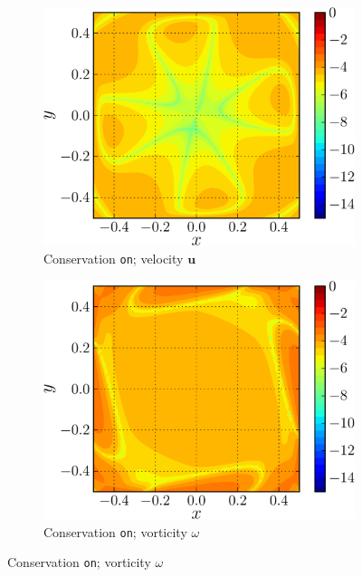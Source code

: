 	\begin{figure}[!t]
     \centering
     \begin{subfigure}[t]{0.45\textwidth}
             \includegraphics[width=\linewidth]{./figures/validation/lambOseent2/lambOseen_fully_vErrorFinal_compressed-crop.png}
             \caption{Conservation \texttt{on}; velocity $\mathbf{u}$}
             \label{fig:lambOseen_fullyCon_vErrorFinal}
     \end{subfigure}%
     \qquad %
    \begin{subfigure}[t]{0.45\textwidth}
             \includegraphics[width=\linewidth]{./figures/validation/lambOseent2/lambOseen_fully_wErrorFinal_compressed-crop.png}
             \caption{Conservation \texttt{on}; vorticity $\omega$}
             \label{fig:lambOseen_fullyCon_wErrorFinal}
     \end{subfigure}%
            

\end{figure}
